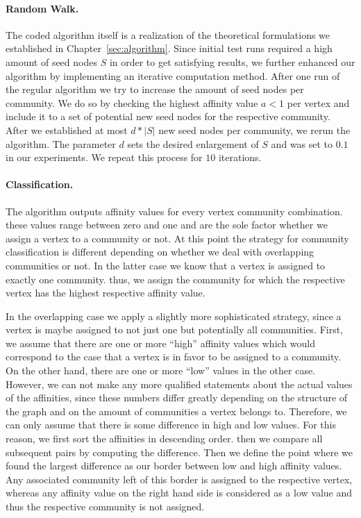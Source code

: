 \paragraph{Random Walk.}
The coded algorithm itself is a realization of the theoretical formulations we 
established in Chapter~\ref{sec:algorithm}. Since initial test runs required a high amount
of seed nodes $S$ in order to get satisfying results, we further enhanced our algorithm by implementing 
an iterative computation method. After one run of the regular algorithm we try to increase the amount of 
seed nodes per community. We do so by checking the highest affinity value $a < 1$ per vertex and include 
it to a set of potential new seed nodes for the respective community. After we established at most 
$d * \left| S \right|$ new seed nodes per community, we rerun the algorithm. The parameter $d$ sets 
the desired enlargement of $S$ and was set to $0.1$ in our experiments. We repeat this process for 
$10$ iterations.

\paragraph{Classification.}
The algorithm outputs affinity values for every vertex community combination. 
these values range between zero and one and are the sole factor whether we 
assign a vertex to a community or not. At this point the strategy for community classification is 
different depending on whether we deal with overlapping communities or not. In the latter case we 
know that a vertex is assigned to exactly one community. thus, we assign the community for which 
the respective vertex has the highest respective affinity value. 

In the overlapping case we apply a slightly more sophisticated strategy, since a vertex is maybe 
assigned to not just one but potentially all communities. First, we assume that there are one 
or more ``high'' affinity values which would correspond to the 
case that a vertex is in favor to be assigned to a community. On the other hand, there are one or 
more ``low'' values in the other case. However, we can not make any more qualified statements 
about the actual values of the affinities, since these numbers differ greatly depending on the 
structure of the graph and on the amount of communities a vertex belongs to. Therefore, we can 
only assume that there is some difference in high and low values. For this reason, we first 
sort the affinities in descending order. then we compare all subsequent pairs by computing 
the difference. Then we define the point where we found the largest difference as our border 
between low and high affinity values. Any associated community left of this border is 
assigned to the respective vertex, whereas any affinity value on the right hand side is considered 
as a low value and thus the respective community is not assigned.

